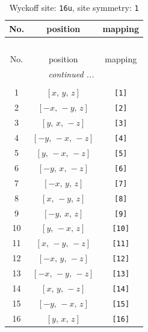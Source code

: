 \documentclass[fleqn,8pt]{jsarticle}
\begin{document}
\begin{longtable}{ccc}
\caption{Wyckoff site: {\tt 16u}, site symmetry: {\tt 1}}
 \\
 \hline \hline
No. & position & mapping \\ \hline \endfirsthead

\multicolumn{2}{l}{\tablename\ \thetable{}} \\
 \hline \hline
No. & position & mapping \\ \hline \endhead

 \hline \hline
\multicolumn{2}{r}{\footnotesize\it continued ...} \\ \endfoot

 \hline \hline
\multicolumn{2}{r}{} \\ \endlastfoot

1 & $\left[ x,\, y,\, z \right]$ & {\tt [1]} \\ \hline
2 & $\left[ - x,\, - y,\, z \right]$ & {\tt [2]} \\ \hline
3 & $\left[ y,\, x,\, - z \right]$ & {\tt [3]} \\ \hline
4 & $\left[ - y,\, - x,\, - z \right]$ & {\tt [4]} \\ \hline
5 & $\left[ y,\, - x,\, - z \right]$ & {\tt [5]} \\ \hline
6 & $\left[ - y,\, x,\, - z \right]$ & {\tt [6]} \\ \hline
7 & $\left[ - x,\, y,\, z \right]$ & {\tt [7]} \\ \hline
8 & $\left[ x,\, - y,\, z \right]$ & {\tt [8]} \\ \hline
9 & $\left[ - y,\, x,\, z \right]$ & {\tt [9]} \\ \hline
10 & $\left[ y,\, - x,\, z \right]$ & {\tt [10]} \\ \hline
11 & $\left[ x,\, - y,\, - z \right]$ & {\tt [11]} \\ \hline
12 & $\left[ - x,\, y,\, - z \right]$ & {\tt [12]} \\ \hline
13 & $\left[ - x,\, - y,\, - z \right]$ & {\tt [13]} \\ \hline
14 & $\left[ x,\, y,\, - z \right]$ & {\tt [14]} \\ \hline
15 & $\left[ - y,\, - x,\, z \right]$ & {\tt [15]} \\ \hline
16 & $\left[ y,\, x,\, z \right]$ & {\tt [16]} \\
\end{longtable}
\end{document}
